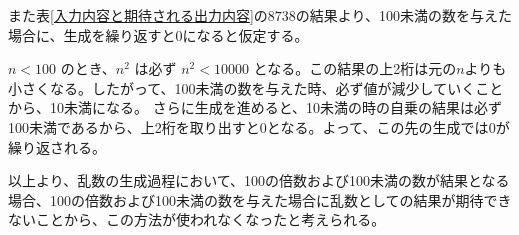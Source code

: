 また表\ref{入力内容と期待される出力内容}の$8738$の結果より、100未満の数を与えた場合に、生成を繰り返すと$0$になると仮定する。

$n < 100$ のとき、$n^2$ は必ず $n^2 < 10000$ となる。この結果の上2桁は元の$n$よりも小さくなる。したがって、100未満の数を与えた時、必ず値が減少していくことから、10未満になる。
さらに生成を進めると、10未満の時の自乗の結果は必ず100未満であるから、上2桁を取り出すと$0$となる。よって、この先の生成では$0$が繰り返される。

以上より、乱数の生成過程において、100の倍数および100未満の数が結果となる場合、100の倍数および100未満の数を与えた場合に乱数としての結果が期待できないことから、この方法が使われなくなったと考えられる。
